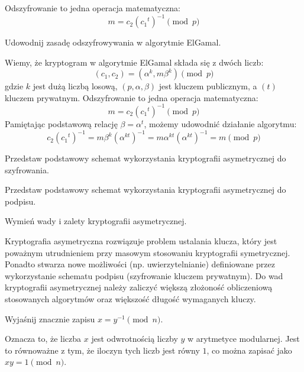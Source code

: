 \documentclass[answers,11pt]{exam}
\begin{document}
\begin{questions}
\begin{solution}
Odszyfrowanie to jedna operacja matematyczna:
\begin{equation}
 m = c_2({c_1}^t)^{-1} \pmod{p}
\end{equation}
\end{solution}

\question Udowodnij zasadę odszyfrowywania w algorytmie ElGamal.
\begin{solution}
Wiemy, że kryptogram w algorytmie ElGamal składa się z dwóch liczb:
\begin{equation}
 (c_1, c_2) = (\alpha^k, m\beta^k) \pmod{p}
\end{equation}
gdzie $k$ jest dużą liczbą losową, $(p,\alpha,\beta)$ jest kluczem publicznym, a $(t)$ kluczem prywatnym. 
Odszyfrowanie to jedna operacja matematyczna:
\begin{equation}
 m = c_2({c_1}^t)^{-1} \pmod{p}
\end{equation}
Pamiętając podstawową relację $\beta=\alpha^t$, możemy udowodnić działanie algorytmu:
\begin{equation}
 c_2({c_1}^t)^{-1} = m\beta^k (\alpha^{kt})^{-1} =  m\alpha^{kt} (\alpha^{kt})^{-1}  = m \pmod{p}
\end{equation}
\end{solution}

\question Przedstaw podstawowy schemat wykorzystania kryptografii asymetrycznej do szyfrowania.

\question Przedstaw podstawowy schemat wykorzystania kryptografii asymetrycznej do podpisu.

\question Wymień wady i zalety kryptografii asymetrycznej.
\begin{solution}
Kryptografia asymetryczna rozwiązuje problem ustalania klucza, który jest poważnym utrudnieniem przy masowym stosowaniu kryptografii symetrycznej. Ponadto stwarza nowe możliwości (np. uwierzytelnianie) definiowane przez wykorzystanie schematu podpisu (szyfrowanie kluczem prywatnym). Do wad kryptografii asymetrycznej należy zaliczyć większą złożoność obliczeniową stosowanych algorytmów oraz większość długość wymaganych kluczy.
\end{solution}


\question Wyjaśnij znacznie zapisu $x = y^{-1} \pmod{n}$.
\begin{solution}
Oznacza to, że liczba $x$ jest odwrotnością liczby $y$ w arytmetyce modularnej. Jest to równoważne z tym, że iloczyn tych liczb jest równy $1$, co można zapisać jako $x y = 1 \pmod{n}$.
\end{solution}


\end{questions}
\end{document}
